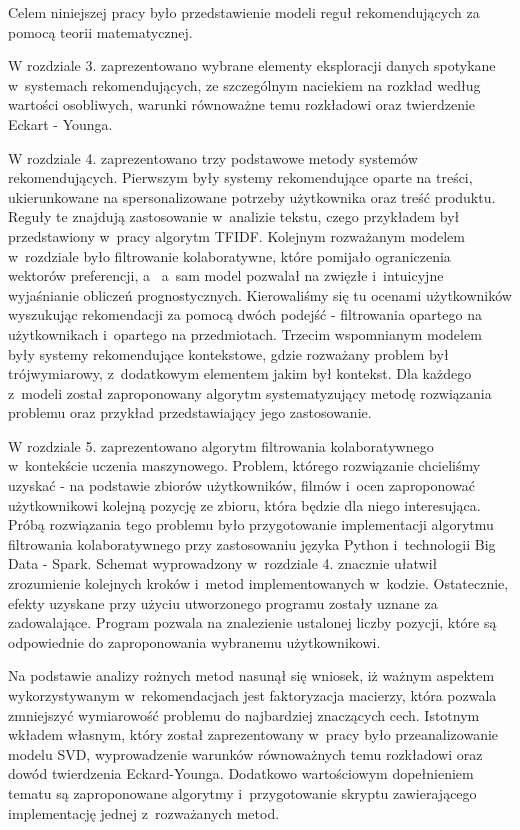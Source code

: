 \documentclass[12pt,a4paper]{report}
\begin{document}
Celem niniejszej pracy było przedstawienie modeli reguł rekomendujących za pomocą teorii matematycznej. 

W rozdziale 3. zaprezentowano wybrane elementy eksploracji danych spotykane w~systemach rekomendujących, ze szczególnym naciekiem na rozkład według wartości osobliwych, warunki równoważne temu rozkładowi oraz twierdzenie Eckart - Younga.

W rozdziale 4. zaprezentowano trzy podstawowe metody systemów rekomendujących. Pierwszym były systemy rekomendujące oparte na treści, ukierunkowane na spersonalizowane potrzeby użytkownika oraz treść produktu. Reguły te znajdują zastosowanie w~analizie tekstu, czego przykładem był przedstawiony w~pracy algorytm TFIDF. Kolejnym rozważanym modelem w~rozdziale było filtrowanie kolaboratywne, które pomijało ograniczenia wektorów preferencji, a~ a~sam model pozwalał na zwięzłe i~intuicyjne wyjaśnianie obliczeń prognostycznych. Kierowaliśmy się tu ocenami użytkowników wyszukując rekomendacji za pomocą dwóch podejść - filtrowania opartego na użytkownikach i~opartego na przedmiotach. Trzecim wspomnianym modelem były systemy rekomendujące kontekstowe, gdzie rozważany problem był trójwymiarowy, z~dodatkowym elementem jakim był kontekst. Dla każdego z~modeli został zaproponowany algorytm systematyzujący metodę rozwiązania problemu oraz przykład przedstawiający jego zastosowanie.

W rozdziale 5. zaprezentowano algorytm filtrowania kolaboratywnego w~kontekście uczenia maszynowego. Problem, którego rozwiązanie chcieliśmy uzyskać - na podstawie zbiorów użytkowników, filmów i~ocen zaproponować użytkownikowi kolejną pozycję ze zbioru, która będzie dla niego interesująca. Próbą rozwiązania tego problemu było przygotowanie implementacji algorytmu filtrowania kolaboratywnego przy zastosowaniu języka Python i~technologii Big Data - Spark. Schemat wyprowadzony w~rozdziale 4. znacznie ułatwił zrozumienie kolejnych kroków i~metod implementowanych w~kodzie. Ostatecznie, efekty uzyskane przy użyciu utworzonego programu zostały uznane za zadowalające. Program pozwala na znalezienie ustalonej liczby pozycji, które są odpowiednie do zaproponowania wybranemu użytkownikowi. 

Na podstawie analizy rożnych metod nasunął się wniosek, iż ważnym aspektem wykorzystywanym w~rekomendacjach jest faktoryzacja macierzy, która pozwala zmniejszyć wymiarowość problemu do najbardziej znaczących cech. Istotnym wkładem własnym, który został zaprezentowany w~pracy było przeanalizowanie modelu SVD, wyprowadzenie warunków równoważnych temu rozkładowi oraz dowód twierdzenia Eckard-Younga. Dodatkowo wartościowym dopełnieniem tematu są zaproponowane algorytmy i~przygotowanie skryptu zawierającego implementację jednej z~rozważanych metod.



\end{document}
